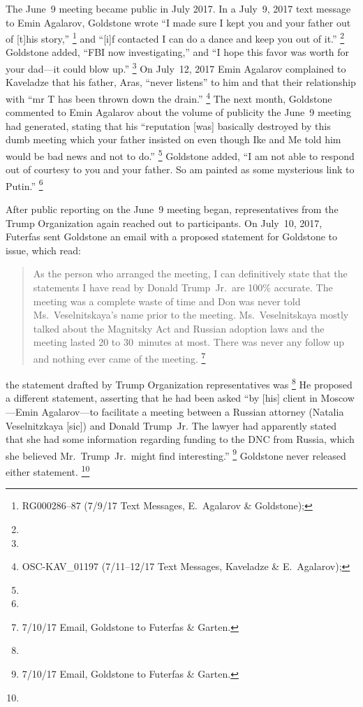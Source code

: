 The June~9 meeting became public in July 2017.
In a July~9, 2017 text message to Emin Agalarov, Goldstone wrote ``I made sure I kept you and your father out of [t]his story,''%
\footnote{RG000286--87 (7/9/17 Text Messages, E.~Agalarov \& Goldstone); }
and ``[i]f contacted I can do a dance and keep you out of it.''%
\footnote{}
Goldstone added, ``FBI now investigating,'' and ``I hope this favor was worth for your dad---it could blow up.''%
\footnote{ }
On July~12, 2017 Emin Agalarov complained to Kaveladze that his father, Aras, ``never listens'' to him and that their relationship with ``mr T has been thrown down the drain.''%
\footnote{OSC-KAV\_01197 (7/11--12/17 Text Messages, Kaveladze \& E.~Agalarov); }
The next month, Goldstone commented to Emin Agalarov about the volume of publicity the June~9 meeting had generated, stating that his ``reputation [was] basically destroyed by this dumb meeting which your father insisted on even though Ike and Me told him would be bad news and not to do.''%
\footnote{}
Goldstone added, ``I am not able to respond out of courtesy to you and your father.
So am painted as some mysterious link to Putin.''%
\footnote{}

After public reporting on the June~9 meeting began, representatives from the Trump Organization again reached out to participants.
On July~10, 2017, Futerfas sent Goldstone an email with a proposed statement for Goldstone to issue, which read:

\begin{quote}
As the person who arranged the meeting, I can definitively state that the statements I have read by Donald Trump~Jr.\ are 100\% accurate.
The meeting was a complete waste of time and Don was never told Ms.~Veselnitskaya's name prior to the meeting.
Ms.~Veselnitskaya mostly talked about the Magnitsky Act and Russian adoption laws and the meeting lasted 20 to 30~minutes at most.
There was never any follow up and nothing ever came of the meeting.%
\footnote{7/10/17 Email, Goldstone to Futerfas \& Garten.}
\end{quote}

the statement drafted by Trump Organization representatives was
\footnote{}
He proposed a different statement, asserting that he had been asked ``by [his] client in Moscow---Emin Agalarov---to facilitate a meeting between a Russian attorney (Natalia Veselnitzkaya [sic]) and Donald Trump~Jr.
The lawyer had apparently stated that she had some information regarding funding to the DNC from Russia, which she believed Mr.~Trump~Jr.\ might find interesting.''%
\footnote{7/10/17 Email, Goldstone to Futerfas \& Garten.}
Goldstone never released either statement.%
\footnote{}


